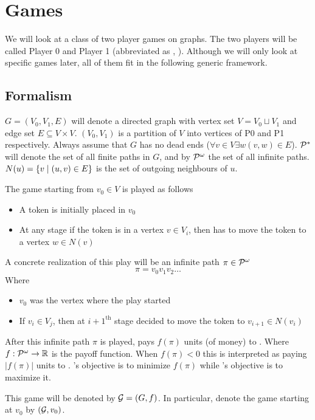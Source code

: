 \chapter{Games}
We will look at a class of two player games on graphs. The two players will be called Player 0 and Player 1 (abbreviated as , ). Although we will only look at specific games later, all of them fit in the following generic framework.

\section{Formalism}
\label{sec:formalism}
$G=(V_0,V_1,E)$ will denote a directed graph with vertex set $V=V_0 \sqcup V_1$ and edge set $E \subseteq V\times V$. $(V_0,V_1)$ is a partition of $V$ into vertices of P0 and P1 respectively. Always assume that $G$ has no dead ends ($\forall v \in V \exists w  (v,w) \in E$). $\mathcal{P}^{*}$ will denote the set of all finite paths in $G$, and by $\mathcal{P}^\omega$ the set of all infinite paths. $N(u)=\{v \mid (u,v) \in E\}$ is the set of outgoing neighbours of $u$.

The game starting from $v_0 \in V$ is played as follows
\begin{itemize}
  \item A token is initially placed in $v_0$
  \item At any stage if the token is in a vertex $v \in V_i$, then  has to move the token to a vertex $w \in N(v)$
\end{itemize}
A concrete realization of this play will be an infinite path $\pi \in \mathcal{P}^\omega$
\[
  \pi = v_0 v_1 v_2 \ldots
\]
Where
\begin{itemize}
  \item $v_0$ was the vertex where the play started
  \item If $v_i \in V_j$, then at ${i+1}^\text{th}$ stage  decided to move the token to $v_{i+1} \in N(v_i)$
\end{itemize}
After this infinite path $\pi$ is played,  pays $f(\pi)$ units (of money) to . Where $f : \mathcal{P}^\omega \to \mathbb{R}
$ is the payoff function. When $f(\pi) < 0$ this is interpreted as  paying $|f(\pi)|$ units to . 's objective is to minimize $f(\pi)$ while 's objective is to maximize it.

This game will be denoted by $\mathcal{G}=(G,f)$. In particular, denote the game starting at $v_0$ by $(\mathcal{G},v_0)$.

